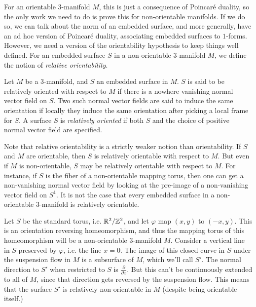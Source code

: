 For an orientable $3$-manifold $M$, this is just a consequence of Poincar\'e duality, so the only
work we need to do is prove this for non-orientable manifolds. If we do so, we can talk about the
norm of an embedded surface, and more generally, have an ad hoc version of Poincar\'e duality,
associating embedded surfaces to $1$-forms. However, we need a version of the orientability
hypothesis to keep things well defined. For an embedded surface $S$ in a non-orientable
$3$-manifold $M$, we define the notion of \emph{relative orientability}.

\begin{defn}
  Let $M$ be a $3$-manifold, and $S$ an embedded surface in $M$. $S$ is said to be relatively
  oriented with respect to $M$ if there is a nowhere vanishing normal vector field on $S$. Two
  such normal vector fields are said to induce the same orientation if locally they induce the
  same orientation after picking a local frame for $S$. A surface $S$ is \emph{relatively oriented}
  if both $S$ and the choice of positive normal vector field are specified.
\end{defn}

Note that relative orientability is a strictly weaker notion than orientability. If $S$ and $M$ are
orientable, then $S$ is relatively orientable with respect to $M$. But even if $M$ is
non-orientable, $S$ may be relatively orientable with respect to $M$. For instance, if $S$ is
the fiber of a non-orientable mapping torus, then one can get a non-vanishing normal vector field
by looking at the pre-image of a non-vanishing vector field on $S^1$.
It is not the case that every embedded surface in a non-orientable $3$-manifold is relatively orientable.
\begin{example}
  Let $S$ be the standard torus, i.e. $\mathbb{R}^2/\mathbb{Z}^2$, and let $\varphi$ map $(x,y)$ to $(-x, y)$. This is an
  orientation reversing homeomorphism, and thus the mapping torus of this homeomorphism will be a
  non-orientable $3$-manifold $M$. Consider a vertical line in $S$ preserved by $\varphi$, i.e. the line
  $x = 0$. The image of this closed curve in $S$ under the suspension flow in $M$ is a subsurface of $M$,
  which we'll call $S'$. The normal direction to $S'$ when restricted to $S$ is $\frac{\partial}{\partial x}$. But
  this can't be continuously extended to all of $M$, since that direction gets reversed by the suspension flow.
  This means that the surface $S'$ is relatively non-orientable in $M$ (despite being orientable itself.)
\end{example}

